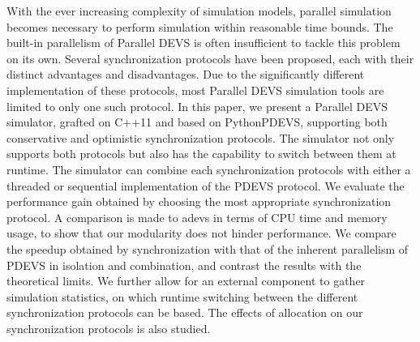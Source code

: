 With the ever increasing complexity of simulation models, parallel simulation becomes necessary to perform simulation within reasonable time bounds.
The built-in parallelism of Parallel DEVS is often insufficient to tackle this problem on its own.
Several synchronization protocols have been proposed, each with their distinct advantages and disadvantages.
Due to the significantly different implementation of these protocols, most Parallel DEVS simulation tools are limited to only one such protocol.
In this paper, we present a Parallel DEVS simulator, grafted on C++11 and based on PythonPDEVS, supporting both conservative and optimistic synchronization protocols.
The simulator not only supports both protocols but also has the capability to switch between them at runtime.
The simulator can combine each synchronization protocols with either a threaded or sequential implementation of the PDEVS protocol.
We evaluate the performance gain obtained by choosing the most appropriate synchronization protocol.
A comparison is made to adevs in terms of CPU time and memory usage, to show that our modularity does not hinder performance.
We compare the speedup obtained by synchronization with that of the inherent parallelism of PDEVS in isolation and combination, and contrast the results with the theoretical limits.
We further allow for an external component to gather simulation statistics, on which runtime switching between the different synchronization protocols can be based.
The effects of allocation on our synchronization protocols is also studied.
